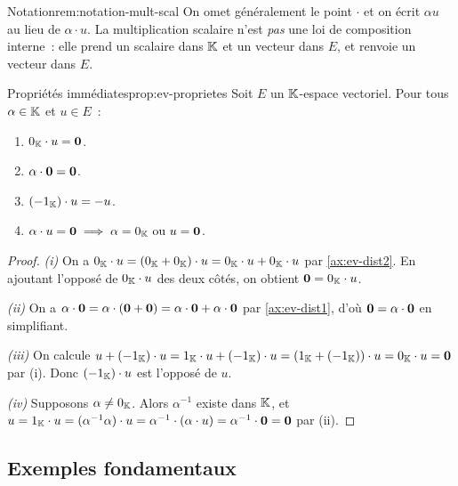 \begin{remark}{Notation}{rem:notation-mult-scal}
  On omet généralement le point $\cdot$ et on écrit $\alpha u$ au lieu
  de $\alpha\cdot u$. La multiplication scalaire n'est \emph{pas} une
  loi de composition interne~: elle prend un scalaire dans ${\mathbb{K}}$ et un
  vecteur dans $E$, et renvoie un vecteur dans $E$.
\end{remark}

\begin{proposition}{Propriétés immédiates}{prop:ev-proprietes}
  Soit $E$ un ${\mathbb{K}}$-espace vectoriel. Pour tous $\alpha\in{\mathbb{K}}$ et $u\in E$~:
  \begin{enumerate}[label=(\roman*)]
    \item $0_{\mathbb{K}}\cdot u = \mathbf{0}$.
    \item $\alpha\cdot\mathbf{0} = \mathbf{0}$.
    \item $(-1_{\mathbb{K}})\cdot u = -u$.
    \item $\alpha\cdot u = \mathbf{0} \implies \alpha = 0_{\mathbb{K}} \text{ ou } u = \mathbf{0}$.
  \end{enumerate}
\end{proposition}

\begin{proof}
  \emph{(i)} On a
  $0_{\mathbb{K}}\cdot u = (0_{\mathbb{K}} + 0_{\mathbb{K}})\cdot u = 0_{\mathbb{K}}\cdot u + 0_{\mathbb{K}}\cdot u$
  par \ref{ax:ev-dist2}. En ajoutant l'opposé de $0_{\mathbb{K}}\cdot u$ des
  deux côtés, on obtient $\mathbf{0} = 0_{\mathbb{K}}\cdot u$.

  \emph{(ii)} On a
  $\alpha\cdot\mathbf{0} = \alpha\cdot(\mathbf{0}+\mathbf{0}) =
  \alpha\cdot\mathbf{0} + \alpha\cdot\mathbf{0}$ par \ref{ax:ev-dist1}, d'où
  $\mathbf{0} = \alpha\cdot\mathbf{0}$ en simplifiant.

  \emph{(iii)} On calcule
  $u + (-1_{\mathbb{K}})\cdot u = 1_{\mathbb{K}}\cdot u + (-1_{\mathbb{K}})\cdot u =
  (1_{\mathbb{K}} + (-1_{\mathbb{K}}))\cdot u = 0_{\mathbb{K}}\cdot u = \mathbf{0}$ par (i). Donc
  $(-1_{\mathbb{K}})\cdot u$ est l'opposé de $u$.

  \emph{(iv)} Supposons $\alpha\neq 0_{\mathbb{K}}$. Alors $\alpha^{-1}$ existe
  dans ${\mathbb{K}}$, et
  $u = 1_{\mathbb{K}}\cdot u = (\alpha^{-1}\alpha)\cdot u =
  \alpha^{-1}\cdot(\alpha\cdot u) = \alpha^{-1}\cdot\mathbf{0} = \mathbf{0}$
  par (ii).
\end{proof}

\subsection{Exemples fondamentaux}\label{subsec:ev-exemples}

